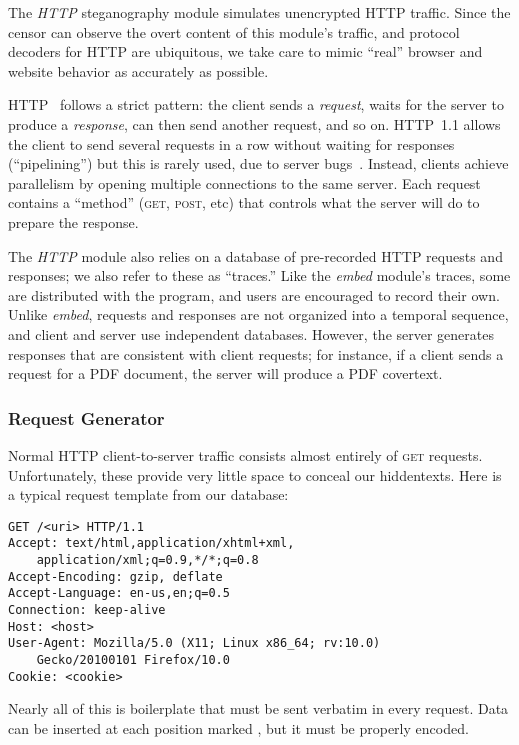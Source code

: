 The \emph{HTTP} steganography module simulates unencrypted HTTP
traffic.  Since the censor can observe the overt content of this
module's traffic, and protocol decoders for HTTP are ubiquitous, we
take care to mimic “real” browser and website behavior as accurately
as possible.

HTTP~\cite{s-http} follows a strict pattern: the client sends a
\emph{request}, waits for the server to produce a \emph{response}, can
then send another request, and so on.  HTTP~1.1 allows the client to
send several requests in a row without waiting for responses
(“pipelining”) but this is rarely used, due to server
bugs~\cite{s-pipeline}.  Instead, clients achieve parallelism by
opening multiple connections to the same server.  Each request
contains a “method” (\textsc{get}, \textsc{post}, etc) that controls
what the server will do to prepare the response.

The \emph{HTTP} module also relies on a database of pre-recorded HTTP
requests and responses; we also refer to these as “traces.”  Like the
\emph{embed} module's traces, some are distributed with the program,
and users are encouraged to record their own.  Unlike \emph{embed},
requests and responses are not organized into a temporal sequence, and
client and server use independent databases.  However, the server
generates responses that are consistent with client requests; for
instance, if a client sends a request for a PDF document, the server
will produce a PDF covertext.

\subsubsection{Request Generator}

Normal HTTP client-to-server traffic consists almost entirely of
\textsc{get} requests.  Unfortunately, these provide very little space
to conceal our hiddentexts.  Here is a typical request template from
our database:

\begin{lstlisting}
GET /<uri> HTTP/1.1
Accept: text/html,application/xhtml+xml,
    application/xml;q=0.9,*/*;q=0.8
Accept-Encoding: gzip, deflate
Accept-Language: en-us,en;q=0.5
Connection: keep-alive
Host: <host>
User-Agent: Mozilla/5.0 (X11; Linux x86_64; rv:10.0)
    Gecko/20100101 Firefox/10.0
Cookie: <cookie>
\end{lstlisting}

\noindent Nearly all of this is boilerplate that must be sent verbatim
in every request.  Data can be inserted at each position marked
\textitt{<\ldots>}, but it must be properly encoded.

